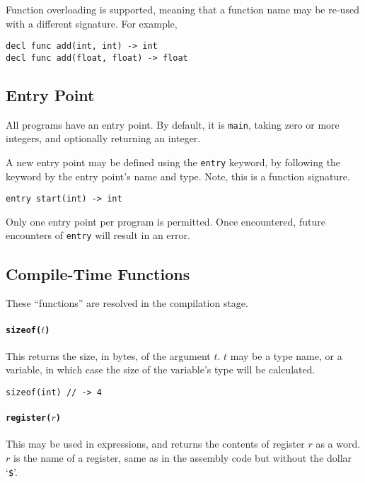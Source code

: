 \documentclass{article}
\begin{document}
Function overloading is supported, meaning that a function name may be re-used with a different signature.
For example,

\begin{lstlisting}[language=CustomLang]
decl func add(int, int) -> int
decl func add(float, float) -> float
\end{lstlisting}

\subsection{Entry Point}

All programs have an entry point.
By default, it is \texttt{main}, taking zero or more integers, and optionally returning an integer.

A new entry point may be defined using the \texttt{entry} keyword, by following the keyword by the entry point's name and type.
Note, this is a function signature.

\begin{lstlisting}[language=CustomLang]
entry start(int) -> int
\end{lstlisting}

Only one entry point per program is permitted.
Once encountered, future encounters of \texttt{entry} will result in an error.

\subsection{Compile-Time Functions}

These ``functions'' are resolved in the compilation stage.

\paragraph*{\texttt{sizeof(\(t\))}}
This returns the size, in bytes, of the argument \(t\).
\(t\) may be a type name, or a variable, in which case the size of the variable's type will be calculated.

\begin{lstlisting}[language=CustomLang]
sizeof(int) // -> 4
\end{lstlisting}

\paragraph*{\texttt{register(\(r\))}}
This may be used in expressions, and returns the contents of register \(r\) as a word.
\(r\) is the name of a register, same as in the assembly code but without the dollar `\texttt{\$}'.
\end{document}
